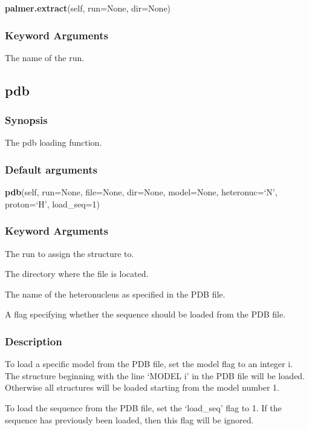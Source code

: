 \textsf{\textbf{palmer.extract}(self, run=None, dir=None)}


\subsubsection{Keyword Arguments}

  The name of the run.


\newpage

\subsection{pdb}


\subsubsection{Synopsis}

The pdb loading function.

\subsubsection{Default arguments}

\textsf{\textbf{pdb}(self, run=None, file=None, dir=None, model=None, heteronuc=`N', proton=`H', load\_seq=1)}


\subsubsection{Keyword Arguments}

  The run to assign the structure to.

  The directory where the file is located.

  The name of the heteronucleus as specified in the PDB file.

  A flag specifying whether the sequence should be loaded from the PDB file.

\subsubsection{Description}

To load a specific model from the PDB file, set the model flag to an integer i.  The
structure beginning with the line `MODEL i' in the PDB file will be loaded.  Otherwise all
structures will be loaded starting from the model number 1.

To load the sequence from the PDB file, set the `load\_seq' flag to 1.  If the sequence has
previously been loaded, then this flag will be ignored.

